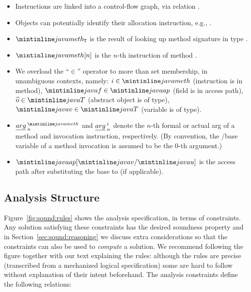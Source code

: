 \begin{itemize}
\item Instructions are linked into a control-flow graph, via relation .

\item Objects can potentially identify their allocation instruction, e.g., .

\item $\code{meth}_\codeRAW{T}$ is the result of looking up method signature  in type .

\item $\code{meth}[n]$ is the $n$-th instruction of method .

\item We overload the ``$\in$'' operator to more than set membership, in unambiguous contexts, namely: $i \in \code{meth}$ (instruction is in method), $\code{f} \in \code{ap}$ (field is in access path), \(\obj{o} \in \code{T}\) (abstract object is of type), $\code{v} \in \code{T}$ (variable is of type).

\item $\formalarg{meth}{n}$ and ${\emph{arg}}^{\:i}_{\:n}$ denote the $n$-th formal or actual arg of a method and invocation instruction, respectively. (By convention, the /base variable of a method invocation is assumed to be the 0-th argument.)

\item $\code{ap}\subst{\code{v}}{\code{u}}$ is the access path  after substituting the base  to  (if applicable).
\end{itemize}


\subsection{Analysis Structure}

Figure~\ref{fig:sound:rules} shows the analysis specification, in terms of constraints. Any solution satisfying these constraints has the desired soundness property and in Section~\ref{sec:sound:reasoning} we discuss extra considerations so that the constraints can also be used to \emph{compute} a solution. We recommend following the figure together with our text explaining the rules: although the rules are precise (transcribed from a mechanized logical specification) some are hard to follow without explanation of their intent beforehand. The analysis constraints define the following relations:

